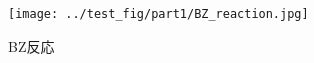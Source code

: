 \documentclass[autodetect-engine,dvipdfmx-if-dvi,a4paper,ja=standard]{bxjsbook}
\begin{document}
\begin{figure}[htbp]
  \centering
  \texttt{[image: ../test\_fig/part1/BZ\_reaction.jpg]}
  \caption{BZ反応\cite{BZ}\cite{elements}}
\end{figure}

\printbibliography[title=参考文献] %
\end{document}
